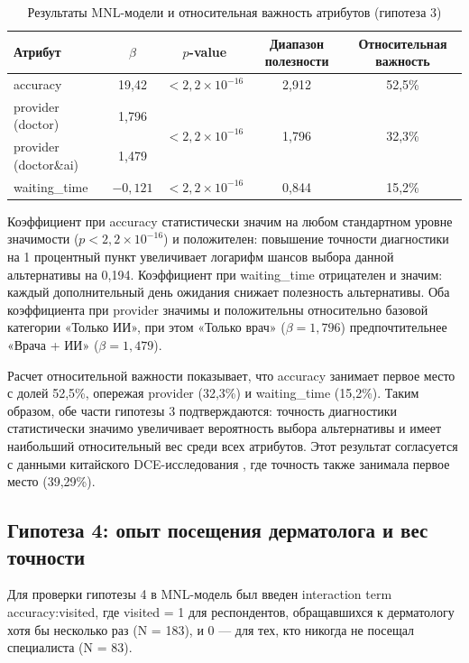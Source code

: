 \documentclass[12pt, a4paper]{article}
\begin{document}
\begin{table}[p]
\centering
\caption{Результаты MNL-модели и относительная важность атрибутов (гипотеза 3)}
\label{tab:hyp3}
\footnotesize
\setlength{\tabcolsep}{4pt}
\begin{tabular}{lcccc}
\toprule
\textbf{Атрибут} & \textbf{$\beta$} & \textbf{$p$-value} & \textbf{Диапазон полезности} & \textbf{Относительная важность} \\
\midrule
accuracy & 19,42 & $<2,2\times10^{-16}$ & 2,912 & 52,5\% \\
provider (doctor) & 1,796 & \multirow{2}{*}{$<2,2\times10^{-16}$} & \multirow{2}{*}{1,796} & \multirow{2}{*}{32,3\%} \\
provider (doctor\&ai) & 1,479 & & & \\
waiting\_time & $-0,121$ & $<2,2\times10^{-16}$ & 0,844 & 15,2\% \\
\bottomrule
\end{tabular}
\end{table}

Коэффициент при accuracy статистически значим на любом стандартном уровне значимости ($p < 2,2\times10^{-16}$) и положителен: повышение точности диагностики на 1 процентный пункт увеличивает логарифм шансов выбора данной альтернативы на 0,194. Коэффициент при waiting\_time отрицателен и значим: каждый дополнительный день ожидания снижает полезность альтернативы. Оба коэффициента при provider значимы и положительны относительно базовой категории «Только ИИ», при этом «Только врач» ($\beta = 1,796$) предпочтительнее «Врача + ИИ» ($\beta = 1,479$).

Расчет относительной важности показывает, что accuracy занимает первое место с долей 52,5\%, опережая provider (32,3\%) и waiting\_time (15,2\%). Таким образом, обе части гипотезы 3 подтверждаются: точность диагностики статистически значимо увеличивает вероятность выбора альтернативы и имеет наибольший относительный вес среди всех атрибутов. Этот результат согласуется с данными китайского DCE-исследования \cite{Liu2021}, где точность также занимала первое место (39,29\%).

\subsection{Гипотеза 4: опыт посещения дерматолога и вес точности}
Для проверки гипотезы 4 в MNL-модель был введен interaction term accuracy:visited, где visited = 1 для респондентов, обращавшихся к дерматологу хотя бы несколько раз (N = 183), и 0 --- для тех, кто никогда не посещал специалиста (N = 83).
\end{document}
